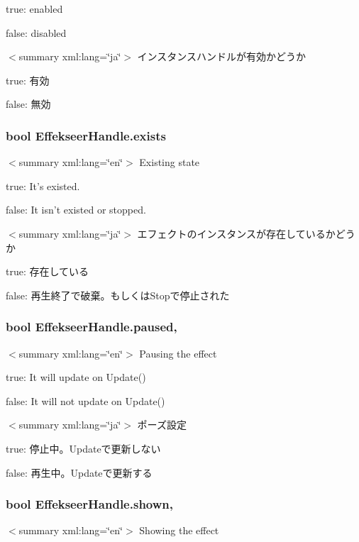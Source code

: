 true\-: enabled

false\-: disabled

$<$summary xml\-:lang=\char`\"{}ja\char`\"{}$>$ インスタンスハンドルが有効かどうか\par
 

true\-: 有効

false\-: 無効\hypertarget{struct_effekseer_handle_ac1d253853e6471ce1e3c951491803c27}{
\subsubsection[{exists}]{\setlength{\rightskip}{0pt plus 5cm}bool Effekseer\-Handle.\-exists\hspace{0.3cm}{\ttfamily [get]}}}\label{struct_effekseer_handle_ac1d253853e6471ce1e3c951491803c27}
$<$summary xml\-:lang=\char`\"{}en\char`\"{}$>$ Existing state 

true\-: It's existed.

false\-: It isn't existed or stopped.

$<$summary xml\-:lang=\char`\"{}ja\char`\"{}$>$ エフェクトのインスタンスが存在しているかどうか 

true\-: 存在している

false\-: 再生終了で破棄。もしくは\-Stopで停止された\hypertarget{struct_effekseer_handle_a3ba9bf72308429369214fd10ebb86ca6}{
\subsubsection[{paused}]{\setlength{\rightskip}{0pt plus 5cm}bool Effekseer\-Handle.\-paused\hspace{0.3cm}{\ttfamily [get]}, {\ttfamily [set]}}}\label{struct_effekseer_handle_a3ba9bf72308429369214fd10ebb86ca6}
$<$summary xml\-:lang=\char`\"{}en\char`\"{}$>$ Pausing the effect 

true\-: It will update on Update()

false\-: It will not update on Update()

$<$summary xml\-:lang=\char`\"{}ja\char`\"{}$>$ ポーズ設定 

true\-: 停止中。\-Updateで更新しない

false\-: 再生中。\-Updateで更新する\hypertarget{struct_effekseer_handle_a96d0ebfe4cab721aaea0992b1750ae43}{
\subsubsection[{shown}]{\setlength{\rightskip}{0pt plus 5cm}bool Effekseer\-Handle.\-shown\hspace{0.3cm}{\ttfamily [get]}, {\ttfamily [set]}}}\label{struct_effekseer_handle_a96d0ebfe4cab721aaea0992b1750ae43}
$<$summary xml\-:lang=\char`\"{}en\char`\"{}$>$ Showing the effect 

